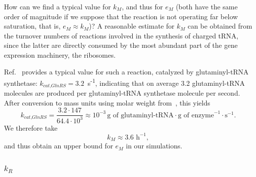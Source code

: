 How can we find a typical value for $k_M$, and thus for $e_M$ (both have the same order of magnitude if we suppose that the reaction is not operating far below saturation, that is, $e_M \approx k_M$)?
A reasonable estimate for $k_M$ can be obtained from the turnover numbers of reactions involved in the synthesis of charged tRNA, since the latter are directly consumed by the most abundant part of the gene expression machinery, the ribosomes.

Ref.~\cite{uter_longrange_2004} provides a typical value for such a reaction, catalyzed by glutaminyl-tRNA synthetase: $k_{\textit{cat,GlnRS}} = 3.2$~s\textsuperscript{-1}, indicating that on average 3.2 glutaminyl-tRNA molecules are produced per glutaminyl-tRNA synthetase molecule per second. 
After conversion to mass units using molar weight from~\cite{freist_glutaminyltrna_1997}, this yields
\[
k_{\textit{cat,GlnRS}} = \frac{3.2 \cdot 147}{64.4 \cdot 10^ 3} \approx 10^{-3} \, \text{g of glutaminyl-tRNA} \cdot \text{g of enzyme}^{-1} \cdot \text{s}^{-1}.
\]
We therefore take
\[
k_M \approx 3.6 \text{ h}^{-1},
\]
and thus obtain an upper bound for $e_M$ in our simulations.

\subsubsection{\Large \texorpdfstring{$k_R$}{kR}}

